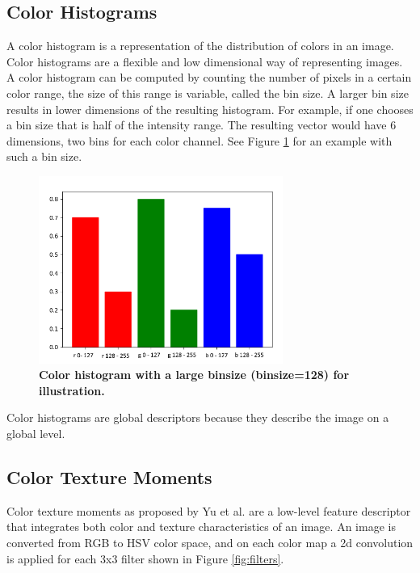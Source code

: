 \documentclass{article}
\begin{document}
\subsection{Color Histograms}
A color histogram is a representation of the distribution of colors in an image. Color histograms are a flexible and low dimensional way of representing images. A color histogram can be computed by counting the number of pixels in a certain color range, the size of this range is variable, called the bin size. A larger bin size results in lower dimensions of the resulting histogram. For example, if one chooses a bin size that is half of the intensity range. The resulting vector would have 6 dimensions, two bins for each color channel. See Figure \ref{fig:colorhistogram} for an example with such a bin size.
\begin{figure}[H]
	\includegraphics[width=8cm]{images/colorhistogram.png}
	\centering
	\caption{\textbf{Color histogram with a large binsize (binsize=128) for illustration.}}
	\label{fig:colorhistogram}
\end{figure}
Color histograms are global descriptors because they describe the image on a global level.

\subsection{Color Texture Moments}
Color texture moments as proposed by Yu et al. \cite{yu2002colortexturemoments} are a low-level feature descriptor that integrates both color and texture characteristics of an image. An image is converted from RGB to HSV color space, and on each color map a 2d convolution is applied for each 3x3 filter shown in Figure \ref{fig:filters}.
\end{document}
